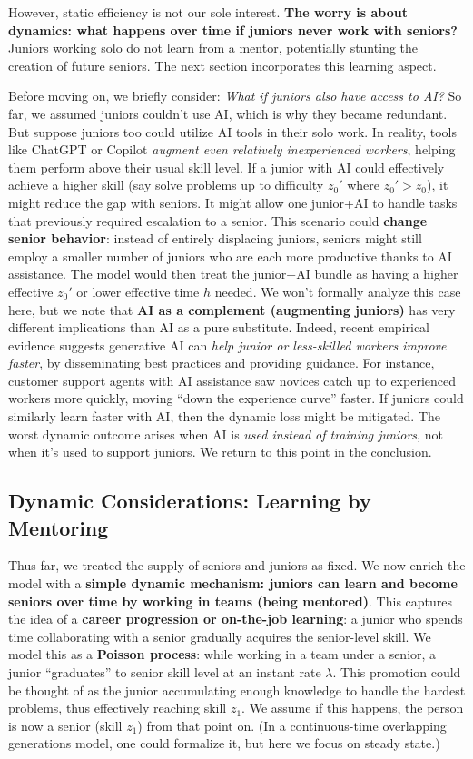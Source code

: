 \documentclass[12pt]{article}
\begin{document}
However, static efficiency is not our sole interest. \textbf{The worry
is about dynamics: what happens over time if juniors never work with
seniors?} Juniors working solo do not learn from a mentor, potentially
stunting the creation of future seniors. The next section incorporates
this learning aspect.

Before moving on, we briefly consider: \emph{What if juniors also have
access to AI?} So far, we assumed juniors couldn't use AI, which is why
they became redundant. But suppose juniors too could utilize AI tools in
their solo work. In reality, tools like ChatGPT or Copilot \emph{augment
even relatively inexperienced workers}, helping them perform above their
usual skill level. If a junior with AI could effectively achieve a
higher skill (say solve problems up to difficulty \(z_0'\) where
\(z_0' > z_0\)), it might reduce the gap with seniors. It might allow
one junior+AI to handle tasks that previously required escalation to a
senior. This scenario could \textbf{change senior behavior}: instead of
entirely displacing juniors, seniors might still employ a smaller number
of juniors who are each more productive thanks to AI assistance. The
model would then treat the junior+AI bundle as having a higher effective
\(z_0'\) or lower effective time \(h\) needed. We won't formally analyze
this case here, but we note that \textbf{AI as a complement (augmenting
juniors)} has very different implications than AI as a pure substitute.
Indeed, recent empirical evidence suggests generative AI can \emph{help
junior or less-skilled workers improve faster}, by disseminating best
practices and providing guidance. For instance, customer support agents
with AI assistance saw novices catch up to experienced workers more
quickly, moving ``down the experience curve'' faster. If juniors could
similarly learn faster with AI, then the dynamic loss might be
mitigated. The worst dynamic outcome arises when AI is \emph{used
instead of training juniors}, not when it's used to support juniors. We
return to this point in the conclusion.

\subsection{Dynamic Considerations: Learning by
Mentoring}\label{dynamic-considerations-learning-by-mentoring}

Thus far, we treated the supply of seniors and juniors as fixed. We now
enrich the model with a \textbf{simple dynamic mechanism: juniors can
learn and become seniors over time by working in teams (being
mentored)}. This captures the idea of a \textbf{career progression or
on-the-job learning}: a junior who spends time collaborating with a
senior gradually acquires the senior-level skill. We model this as a
\textbf{Poisson process}: while working in a team under a senior, a
junior ``graduates'' to senior skill level at an instant rate
\(\lambda\). This promotion could be thought of as the junior
accumulating enough knowledge to handle the hardest problems, thus
effectively reaching skill \(z_1\). We assume if this happens, the
person is now a senior (skill \(z_1\)) from that point on. (In a
continuous-time overlapping generations model, one could formalize it,
but here we focus on steady state.)
\end{document}
